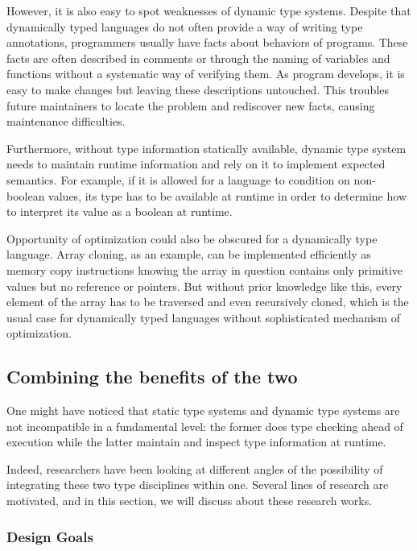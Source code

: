 However, it is also easy to spot weaknesses of dynamic type systems.
Despite that dynamically typed languages do not often provide a way of writing type annotations,
programmers usually have facts about behaviors of programs.
These facts are often described in comments or through the naming of variables and functions without a systematic way of verifying them.
As program develops, it is easy to make changes but leaving these descriptions untouched.
This troubles future maintainers to locate the problem and rediscover new facts,
causing maintenance difficulties.

Furthermore, without type information statically available,
dynamic type system needs to maintain runtime information
and rely on it to implement expected semantics.
For example, if it is allowed for a language to condition on non-boolean values,
its type has to be available at runtime in order to
determine how to interpret its value as a boolean at runtime.

Opportunity of optimization could also be obscured for a dynamically type language.
Array cloning, as an example,
can be implemented efficiently as memory copy instructions
knowing the array in question contains only primitive values but no reference or pointers.
But without prior knowledge like this,
every element of the array has to be traversed and even recursively cloned,
which is the usual case for dynamically typed languages without sophisticated mechanism
of optimization.

\subsection{Combining the benefits of the two}

One might have noticed that static type systems and dynamic type systems
are not incompatible in a fundamental level:
the former does type checking ahead of execution while
the latter maintain and inspect type information at runtime.

Indeed, researchers have been looking at different angles of
the possibility of integrating these two type disciplines within one.
Several lines of research are motivated,
and in this section, we will discuss about these research works.

\subsubsection{Design Goals}


